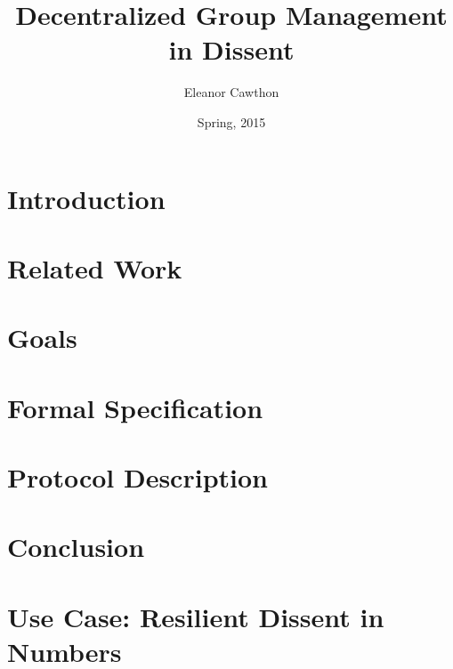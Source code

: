 \documentclass[finalcopy,nolof,nolot]{srpaper}
\title{Decentralized Group Management in Dissent}
\author{Eleanor Cawthon}
\date{Spring, 2015}
\begin{document}
\frontmatter

\chapter{Introduction}\label{Chapter:Intro}


\chapter{Related Work}\label{Chapter:Existing}


\chapter{Goals}\label{Chapter:Goals}


\chapter{Formal Specification}\label{Chapter:Spec}


\chapter{Protocol Description}\label{Chapter:Protocol}


\chapter{Conclusion}\label{Chapter:Conclusion}


\listoftodos

% 

\appendix
  \chapter{Use Case: Resilient Dissent in Numbers}\label{Appendix:Dissent}
  
% 
\end{document}
